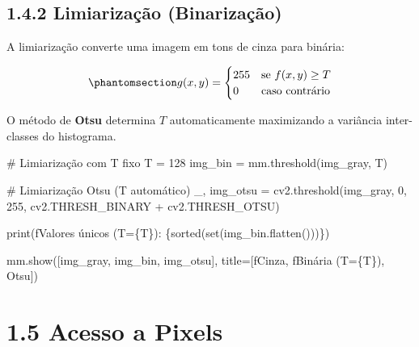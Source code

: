 \documentclass[
  portuguese,
  letterpaper,
  openany,
  oneside,
  12pt,
  a4paper]{book}
\newenvironment{Shaded}{\begin{snugshade}}{\end{snugshade}}
\newcommand{\BuiltInTok}[1]{\textcolor[rgb]{0.00,0.23,0.31}{#1}}
\newcommand{\CommentTok}[1]{\textcolor[rgb]{0.37,0.37,0.37}{#1}}
\newcommand{\DecValTok}[1]{\textcolor[rgb]{0.68,0.00,0.00}{#1}}
\newcommand{\NormalTok}[1]{\textcolor[rgb]{0.00,0.23,0.31}{#1}}
\newcommand{\OperatorTok}[1]{\textcolor[rgb]{0.37,0.37,0.37}{#1}}
\newcommand{\SpecialCharTok}[1]{\textcolor[rgb]{0.37,0.37,0.37}{#1}}
\newcommand{\SpecialStringTok}[1]{\textcolor[rgb]{0.13,0.47,0.30}{#1}}
\newcommand{\StringTok}[1]{\textcolor[rgb]{0.13,0.47,0.30}{#1}}
\begin{document}
\begin{tcolorbox}
\subsection{1.4.2 Limiarização
(Binarização)}\label{limiarizauxe7uxe3o-binarizauxe7uxe3o}

A limiarização converte uma imagem em tons de cinza para binária:

\begin{equation}\phantomsection\label{eq-1-limiar}{g(x,y) = \begin{cases} 255 & \text{se } f(x,y) \geq T \\ 0 & \text{caso contrário} \end{cases}}\end{equation}

O método de \textbf{Otsu} \autocite{otsu1979} determina \(T\)
automaticamente maximizando a variância inter-classes do histograma.

\begin{Shaded}
\begin{Highlighting}[]
\CommentTok{\# Limiarização com T fixo}
\NormalTok{T }\OperatorTok{=} \DecValTok{128}
\NormalTok{img\_bin }\OperatorTok{=}\NormalTok{ mm.threshold(img\_gray, T)}

\CommentTok{\# Limiarização Otsu (T automático)}
\NormalTok{\_, img\_otsu }\OperatorTok{=}\NormalTok{ cv2.threshold(img\_gray, }\DecValTok{0}\NormalTok{, }\DecValTok{255}\NormalTok{,}
\NormalTok{                             cv2.THRESH\_BINARY }\OperatorTok{+}\NormalTok{ cv2.THRESH\_OTSU)}

\BuiltInTok{print}\NormalTok{(}\SpecialStringTok{f\textquotesingle{}Valores únicos (T=}\SpecialCharTok{\{}\NormalTok{T}\SpecialCharTok{\}}\SpecialStringTok{): }\SpecialCharTok{\{}\BuiltInTok{sorted}\NormalTok{(}\BuiltInTok{set}\NormalTok{(img\_bin.flatten()))}\SpecialCharTok{\}}\SpecialStringTok{\textquotesingle{}}\NormalTok{)}

\NormalTok{mm.show([img\_gray, img\_bin, img\_otsu],}
\NormalTok{        title}\OperatorTok{=}\NormalTok{[}\SpecialStringTok{f\textquotesingle{}Cinza\textquotesingle{}}\NormalTok{, }\SpecialStringTok{f\textquotesingle{}Binária (T=}\SpecialCharTok{\{}\NormalTok{T}\SpecialCharTok{\}}\SpecialStringTok{)\textquotesingle{}}\NormalTok{, }\StringTok{\textquotesingle{}Otsu\textquotesingle{}}\NormalTok{])}
\end{Highlighting}
\end{Shaded}

\section{1.5 Acesso a Pixels}\label{acesso-a-pixels-1}


\end{tcolorbox}
\end{document}
